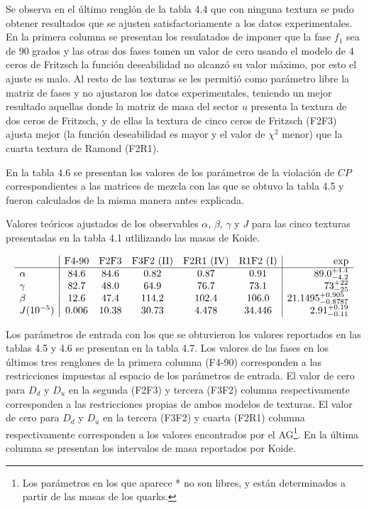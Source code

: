 Se observa en el \'ultimo rengl\'on de la tabla 4.4 que con ninguna textura se
pudo obtener resultados que se ajusten satisfactoriamente a los datos
experimentales. En la primera columna se presentan los resulatados de imponer
que la fase $f_1$ sea de 90 grados y las otras dos fases tomen un valor de cero
usando el modelo de 4 ceros de Fritzsch la funci\'on deseabilidad no alcanz\'o
su valor m\'aximo, por esto el ajuste es malo. Al resto de las texturas se les
permiti\'o como par\'ametro libre la matriz de fases y no ajustaron los datos
experimentales, teniendo un mejor resultado aquellas donde la matriz de masa del
sector $u$ presenta la textura de dos ceros de Fritzsch, y de ellas la textura
de cinco ceros de Fritzsch (F2F3) ajusta mejor (la funci\'on deseabilidad es
mayor y el valor de $\chi^2$ menor) que la cuarta textura de Ramond (F2R1). 

En la tabla 4.6 se presentan los valores de los par\'ametros de la
violaci\'on de $CP$ correspondientes a las matrices de mezcla con las que se
obtuvo la tabla 4.5 y fueron calculados de la misma manera antes
explicada.

{\tiny
\begin{table}[h!]\label{trba}
\caption{Valores te\'oricos ajustados de los observables $\alpha$, $\beta$,  
$\gamma$ y $J$ para las cinco texturas presentadas en la tabla 4.1
utlilizando las masas de Koide.}
$$\ba{l|ccccc|r}
 &\mbox{F4-90}&\mbox{F2F3}&\mbox{F3F2 (II)}&\mbox{F2R1 (IV)}&\mbox{R1F2 (I)}&
\mbox{exp}\\ \hline

\alpha & 84.6 & 84.6 & 0.82 & 0.87 & 0.91 & 89.0^{+4.4}_{-4.2}  \\
\gamma & 82.7 & 48.0 & 64.9 & 76.7 & 73.1 & 73^{+22}_{-25}      \\
\beta  & 12.6 & 47.4 & 114.2 & 102.4 & 106.0 & 21.1495^{+0.905}_{-0.8787} \\
J (10^{-5})& 0.006   & 10.38 & 30.73 & 4.478 & 34.446 & 
2.91^{+0.19}_{-0.11} \\
\ea
$$\end{table} }


Los par\'ametros de entrada con los que se obtuvieron los valores reportados
en las tablas 4.5 y 4.6 se presentan en la tabla 4.7.
Los valores de las fases en los \'ultimos tres renglones  de la primera columna
(F4-90) corresponden a las restricciones impuestas al espacio de los
par\'ametros de entrada. El valor de cero para $D_d$ y $D_u$ en la segunda
(F2F3) y tercera (F3F2) columna respectivamente corresponden a las restricciones
propias de ambos modelos de texturas. El valor de cero para $D_d$ y $D_u$ en la
tercera (F3F2) y cuarta (F2R1) columna respectivamente corresponden a los
valores encontrados por el AG\footnote{Los par\'ametros en los que aparece * no
son libres, y est\'an determinados a partir de las masas de los quarks.}. En la
\'ultima columna se presentan los intervalos de masa reportados por Koide.

